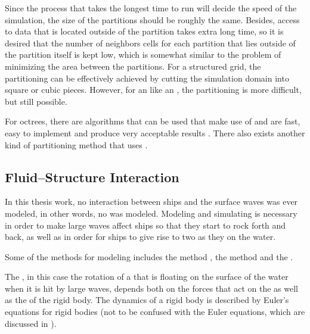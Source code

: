 Since the process that takes the longest time to run will decide the speed of the simulation, the size of the partitions should be roughly the same. Besides, access to data that is located outside of the partition takes extra long time, so it is desired that the number of neighbors cells for each partition that lies outside of the partition itself is kept low, which is somewhat similar to the problem of minimizing the area between the partitions. For a structured grid, the partitioning can be effectively achieved by cutting the simulation domain into square or cubic pieces. However, for an  like an \octree, the partitioning is more difficult, but still possible.

For octrees, there are algorithms that can be used that make use of  and are fast, easy to implement and produce very acceptable results \citep{Valgaerts,Ji2012}. There also exists another kind of partitioning method that uses  \citep{Fuster2011,Agbaglah2011}.

\subsection{Fluid--Structure Interaction}

In this thesis work, no interaction between ships and the surface waves was ever modeled, in other words, no \FSI was modeled. Modeling and simulating \FSI is necessary in order to make large waves affect ships so that they start to rock forth and back, as well as in order for ships to give rise to two  as they \sail on the water.

Some of the methods for modeling \FSI includes the \IB method \citep{Peskin2002,Ghias2007}, the \VOS method and the  \citep{Carlson2004}.

The , in this case the rotation of a \ship that is floating on the surface of the water when it is hit by large waves, depends both on the forces that act on the  as well as the   of the rigid body. The dynamics of a rigid body is described by Euler's equations for rigid bodies (not to be confused with the Euler equations, which are discussed in ).

